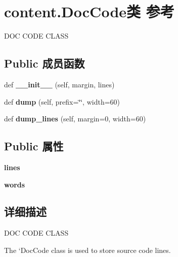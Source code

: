 \hypertarget{classcontent_1_1_doc_code}{}\section{content.\+Doc\+Code类 参考}
\label{classcontent_1_1_doc_code}


D\+OC C\+O\+DE C\+L\+A\+SS  


\subsection*{Public 成员函数}
\begin{DoxyCompactItemize}
\item 
\mbox{\label{classcontent_1_1_doc_code_a5f4187819fa137c62d33cb3006fc1cf7}} 
def {\bfseries \+\_\+\+\_\+init\+\_\+\+\_\+} (self, margin, lines)
\item 
\mbox{\label{classcontent_1_1_doc_code_a5a77b852a738b866cf8fd6ad27e653cf}} 
def {\bfseries dump} (self, prefix=\char`\"{}\char`\"{}, width=60)
\item 
\mbox{\label{classcontent_1_1_doc_code_ad7aa89f37768e49053f72b06ec454f8a}} 
def {\bfseries dump\+\_\+lines} (self, margin=0, width=60)
\end{DoxyCompactItemize}
\subsection*{Public 属性}
\begin{DoxyCompactItemize}
\item 
\mbox{\label{classcontent_1_1_doc_code_acf0bd44d8350b84b7d71d2332968846e}} 
{\bfseries lines}
\item 
\mbox{\label{classcontent_1_1_doc_code_a9eb6bc9b9b3684e1722425e537288141}} 
{\bfseries words}
\end{DoxyCompactItemize}


\subsection{详细描述}
D\+OC C\+O\+DE C\+L\+A\+SS 

The `\+Doc\+Code\textquotesingle{} class is used to store source code lines.

